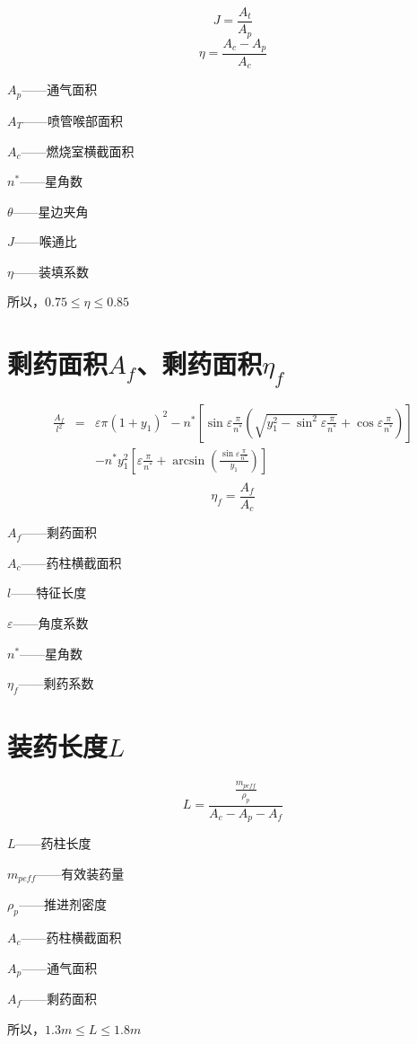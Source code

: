 \endgroup

\[
J=\frac{A_{t}}{A_{p}}
\]
\[
  \eta =\frac{A_c-A_p}{A_c}
\]

$A_{p}$——通气面积

$A_{T}$——喷管喉部面积

$A_{c}$——燃烧室横截面积

$n^*$——星角数

$\theta$——星边夹角

$J$——喉通比

$\eta$——装填系数

所以，$0.75\leqslant \eta \leqslant 0.85$

\section{剩药面积$A_{f}$、剩药面积\texorpdfstring{$\eta_{f}$}{}}
\begingroup
\fontsize{16}{14}\selectfont 
\[
  \begin{array}{ccl}
    \frac{A_f}{l^2}&		=&		\varepsilon \pi \left( 1+y_1 \right) ^2-n^*\left[ \sin \varepsilon \frac{\pi}{n^*}\left( \sqrt{y_{1}^{2}-\sin ^2\varepsilon \frac{\pi}{n^*}}+\cos \varepsilon \frac{\pi}{n^*} \right) \right]\\[1.5em]
    &		&		-n^*y_{1}^{2}\left[ \varepsilon \frac{\pi}{n^*}+\arcsin\left( \frac{\sin \varepsilon \frac{\pi}{n^*}}{y_1} \right) \right]\\
  \end{array}\]
  \endgroup
\[
\eta _f=\frac{A_f}{A_c}
\]

$A_{f}$——剩药面积

$A_{c}$——药柱横截面积

$l$——特征长度

$\varepsilon$——角度系数

$n^*$——星角数

$\eta_{f}$——剩药系数

  \section{装药长度$L$}
\[
L=\frac{\frac{m_{peff}}{\rho _p}}{A_c-A_p-A_f}
\]

$L$——药柱长度

$m_{peff}$——有效装药量

$\rho_{p}$——推进剂密度

$A_{c}$——药柱横截面积

$A_{p}$——通气面积

$A_{f}$——剩药面积

所以，$1.3m\leqslant L\leqslant 1.8m$

